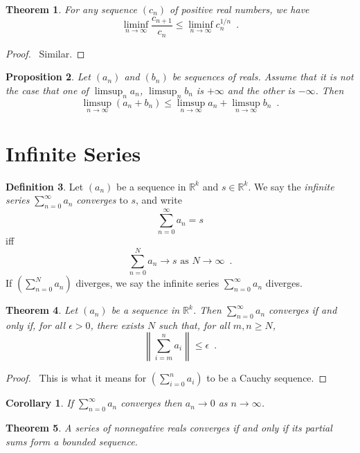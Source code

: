 \documentclass{book}
\let\qed\relax
\newtheorem{prop}{Proposition}[chapter]
\newtheorem{cor}{Corollary}[prop]
\newtheorem{thm}[prop]{Theorem}
\theoremstyle{definition}
\newtheorem{df}[prop]{Definition}
\begin{document}
\begin{thm}
For any sequence $(c_n)$ of positive real numbers, we have
\[ \liminf_{n \rightarrow \infty} \frac{c_{n+1}}{c_n} \leq \liminf_{n \rightarrow \infty} c_n^{1/n} \enspace . \]
\end{thm}

\begin{proof}
\pf\ Similar. \qed
\end{proof}

\begin{prop}
Let $(a_n)$ and $(b_n)$ be sequences of reals. Assume that it is not the case that one of $\limsup_n a_n$, $\limsup_n b_n$ is $+ \infty$ and the other is $- \infty$. Then
\[ \limsup_{n \rightarrow \infty} (a_n + b_n) \leq \limsup_{n \rightarrow \infty} a_n + \limsup_{n \rightarrow \infty} b_n \enspace . \]
\end{prop}

\section{Infinite Series}

\begin{df}
Let $(a_n)$ be a sequence in $\mathbb{R}^k$ and $s \in \mathbb{R}^k$. We say the \emph{infinite series} $\sum_{n=0}^\infty a_n$ \emph{converges} to $s$, and write
\[ \sum_{n=0}^\infty a_n = s \]
iff
\[ \sum_{n=0}^N a_n \rightarrow s \text{ as } N \rightarrow \infty \enspace . \]
If $(\sum_{n=0}^N a_n)$ diverges, we say the infinite series $\sum_{n=0}^\infty a_n$ diverges.
\end{df}

\begin{thm}
Let $(a_n)$ be a sequence in $\mathbb{R}^k$. Then $\sum_{n=0}^\infty a_n$ converges if and only if, for all $\epsilon > 0$, there exists $N$ such that, for all $m,n \geq N$,
\[ \left\| \sum_{i=m}^n a_i \right\| \leq \epsilon \enspace . \]
\end{thm}

\begin{proof}
\pf\ This is what it means for $(\sum_{i=0}^n a_i)$ to be a Cauchy sequence. \qed
\end{proof}

\begin{cor}
\label{cor:terms_of_convergent_series_tend_to_zero}
If $\sum_{n=0}^\infty a_n$ converges then $a_n \rightarrow 0$ as $n \rightarrow \infty$.
\end{cor}

\begin{thm}
A series of nonnegative reals converges if and only if its partial sums form a bounded sequence.
\end{thm}
\end{document}

